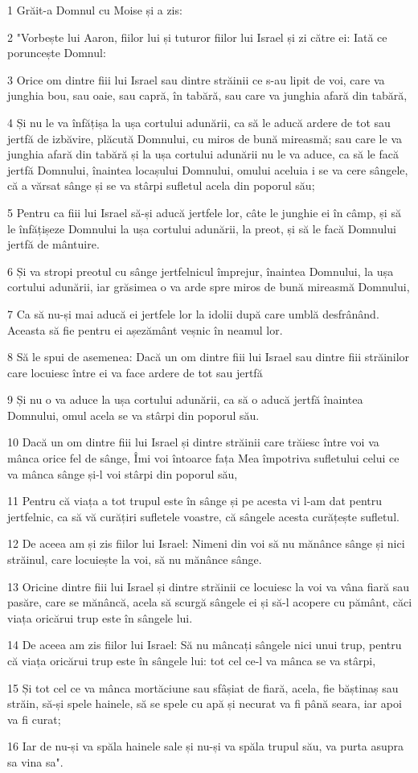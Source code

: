 \par 1 Grăit-a Domnul cu Moise și a zis:
\par 2 "Vorbește lui Aaron, fiilor lui și tuturor fiilor lui Israel și zi către ei: Iată ce poruncește Domnul:
\par 3 Orice om dintre fiii lui Israel sau dintre străinii ce s-au lipit de voi, care va junghia bou, sau oaie, sau capră, în tabără, sau care va junghia afară din tabără,
\par 4 Și nu le va înfățișa la ușa cortului adunării, ca să le aducă ardere de tot sau jertfă de izbăvire, plăcută Domnului, cu miros de bună mireasmă; sau care le va junghia afară din tabără și la ușa cortului adunării nu le va aduce, ca să le facă jertfă Domnului, înaintea locașului Domnului, omului aceluia i se va cere sângele, că a vărsat sânge și se va stârpi sufletul acela din poporul său;
\par 5 Pentru ca fiii lui Israel să-și aducă jertfele lor, câte le junghie ei în câmp, și să le înfățișeze Domnului la ușa cortului adunării, la preot, și să le facă Domnului jertfă de mântuire.
\par 6 Și va stropi preotul cu sânge jertfelnicul împrejur, înaintea Domnului, la ușa cortului adunării, iar grăsimea o va arde spre miros de bună mireasmă Domnului,
\par 7 Ca să nu-și mai aducă ei jertfele lor la idolii după care umblă desfrânând. Aceasta să fie pentru ei așezământ veșnic în neamul lor.
\par 8 Să le spui de asemenea: Dacă un om dintre fiii lui Israel sau dintre fiii străinilor care locuiesc între ei va face ardere de tot sau jertfă
\par 9 Și nu o va aduce la ușa cortului adunării, ca să o aducă jertfă înaintea Domnului, omul acela se va stârpi din poporul său.
\par 10 Dacă un om dintre fiii lui Israel și dintre străinii care trăiesc între voi va mânca orice fel de sânge, Îmi voi întoarce fața Mea împotriva sufletului celui ce va mânca sânge și-l voi stârpi din poporul său,
\par 11 Pentru că viața a tot trupul este în sânge și pe acesta vi l-am dat pentru jertfelnic, ca să vă curățiri sufletele voastre, că sângele acesta curățește sufletul.
\par 12 De aceea am și zis fiilor lui Israel: Nimeni din voi să nu mănânce sânge și nici străinul, care locuiește la voi, să nu mănânce sânge.
\par 13 Oricine dintre fiii lui Israel și dintre străinii ce locuiesc la voi va vâna fiară sau pasăre, care se mănâncă, acela să scurgă sângele ei și să-l acopere cu pământ, căci viața oricărui trup este în sângele lui.
\par 14 De aceea am zis fiilor lui Israel: Să nu mâncați sângele nici unui trup, pentru că viața oricărui trup este în sângele lui: tot cel ce-l va mânca se va stârpi,
\par 15 Și tot cel ce va mânca mortăciune sau sfâșiat de fiară, acela, fie băștinaș sau străin, să-și spele hainele, să se spele cu apă și necurat va fi până seara, iar apoi va fi curat;
\par 16 Iar de nu-și va spăla hainele sale și nu-și va spăla trupul său, va purta asupra sa vina sa".

